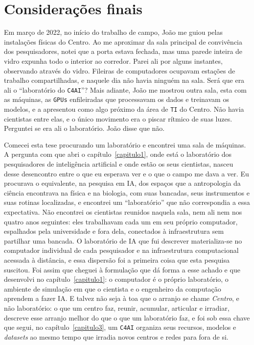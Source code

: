 \chapter*{Considerações finais}

Em março de 2022, no início do trabalho de campo, João me guiou pelas instalações físicas do Centro. Ao me aproximar da sala principal de convivência dos pesquisadores, notei que a porta estava fechada, mas uma parede inteira de vidro expunha todo o interior ao corredor. Parei ali por alguns instantes, observando através do vidro. Fileiras de computadores ocupavam estações de trabalho compartilhadas, e naquele dia não havia ninguém na sala. Será que era ali o \enquote{laboratório do \texttt{C4AI}}? Mais adiante, João me mostrou outra sala, esta com as máquinas, as \texttt{GPUs} enfileiradas que processavam os dados e treinavam os modelos, e a apresentou como algo próximo da área de \texttt{TI} do Centro. Não havia cientistas entre elas, e o único movimento era o piscar rítmico de suas luzes. Perguntei se era ali o laboratório. João disse que não.

Comecei esta tese procurando um laboratório e encontrei uma sala de máquinas. A pergunta com que abri o capítulo~\ref{capitulo1}, onde está o laboratório dos pesquisadores de inteligência artificial e onde estão os seus cientistas, nasceu desse desencontro entre o que eu esperava ver e o que o campo me dava a ver. Eu procurava o equivalente, na pesquisa em IA, dos espaços que a antropologia da ciência encontrava na física e na biologia, com suas bancadas, seus instrumentos e suas rotinas localizadas, e encontrei um \enquote{laboratório} que não correspondia a essa expectativa. Não encontrei os cientistas reunidos naquela sala, nem ali nem nos quatro anos seguintes: eles trabalhavam cada um em seu próprio computador, espalhados pela universidade e fora dela, conectados à infraestrutura sem partilhar uma bancada. O laboratório de IA que fui descrever materializa-se no computador individual de cada pesquisador e na infraestrutura computacional acessada à distância, e essa dispersão foi a primeira coisa que esta pesquisa suscitou. Foi assim que cheguei à formulação que dá forma a esse achado e que desenvolvi no capítulo~\ref{capitulo1}: o computador é o próprio laboratório, o ambiente de simulação em que o cientista e o engenheiro da computação aprendem a fazer IA. E talvez não seja à toa que o arranjo se chame \emph{Centro}, e não laboratório: o que um centro faz, reunir, acumular, articular e irradiar, descreve esse arranjo melhor do que o que um laboratório faz, e foi sob essa chave que segui, no capítulo~\ref{capitulo3}, um \texttt{C4AI} organiza seus recursos, modelos e \textit{datasets} ao mesmo tempo que irradia novos centros e redes para fora de si. 

